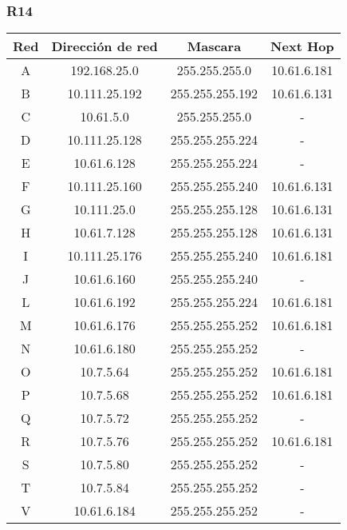 \subsubsection{R14}
\begin{table}[!htbp]
\centering
  \begin{tabular}{|c|c|c|c|}
  \hline
Red & Dirección de red & Mascara & Next Hop\\ \hline
A & 192.168.25.0 & 255.255.255.0 & 10.61.6.181 \\ \hline
B & 10.111.25.192 & 255.255.255.192 & 10.61.6.131 \\ \hline
C & 10.61.5.0 & 255.255.255.0 & -\\ \hline
D & 10.111.25.128 & 255.255.255.224 & -\\ \hline
E & 10.61.6.128 & 255.255.255.224 & -\\ \hline
F & 10.111.25.160 & 255.255.255.240 & 10.61.6.131 \\ \hline
G & 10.111.25.0 & 255.255.255.128 & 10.61.6.131 \\ \hline
H & 10.61.7.128 & 255.255.255.128 & 10.61.6.131 \\ \hline
I & 10.111.25.176 & 255.255.255.240 & 10.61.6.181 \\ \hline
J & 10.61.6.160 & 255.255.255.240 & -\\ \hline
L & 10.61.6.192 & 255.255.255.224 & 10.61.6.181 \\ \hline
M & 10.61.6.176 & 255.255.255.252 & 10.61.6.181 \\ \hline
N & 10.61.6.180 & 255.255.255.252 & -\\ \hline
O & 10.7.5.64 & 255.255.255.252 & 10.61.6.181 \\ \hline
P & 10.7.5.68 & 255.255.255.252 & 10.61.6.181 \\ \hline
Q & 10.7.5.72 & 255.255.255.252 & -\\ \hline
R & 10.7.5.76 & 255.255.255.252 & 10.61.6.181 \\ \hline
S & 10.7.5.80 & 255.255.255.252 & -\\ \hline
T & 10.7.5.84 & 255.255.255.252 & -\\ \hline
V & 10.61.6.184 & 255.255.255.252 & -\\
  \hline
 \end{tabular}
\end{table}

\newpage
